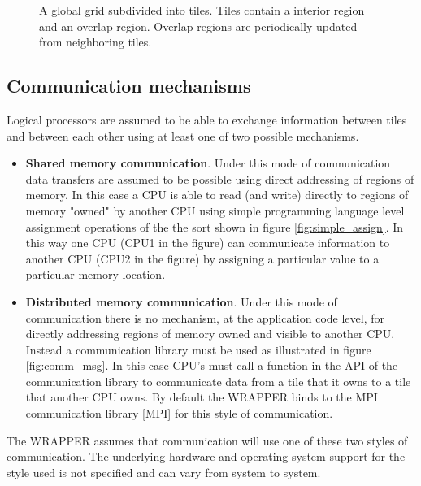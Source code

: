 \begin{figure}
\begin{center}
\end{center}
\caption{ A global grid subdivided into tiles.
Tiles contain a interior region and an overlap region.
Overlap regions are periodically updated from neighboring tiles.
} \label{fig:tiledworld} 
\end{figure}

\subsection{Communication mechanisms}

 Logical processors are assumed to be able to exchange information
between tiles and between each other using at least one of two possible 
mechanisms. 

\begin{itemize}
\item {\bf Shared memory communication}.
Under this mode of communication data transfers are assumed to be possible 
using direct addressing of regions of memory. In this case a CPU is able to read
(and write) directly to regions of memory "owned" by another CPU
using simple programming language level assignment operations of the
the sort shown in figure \ref{fig:simple_assign}. In this way one CPU
(CPU1 in the figure) can communicate information to another CPU (CPU2 in the 
figure) by assigning a particular value to a particular memory location.

\item {\bf Distributed memory communication}. 
Under this mode of communication there is no mechanism, at the application code level,
for directly addressing regions of memory owned and visible to another CPU. Instead 
a communication library must be used as illustrated in figure 
\ref{fig:comm_msg}. In this case CPU's must call a function in the API of the 
communication library to communicate data from a tile that it owns to a tile
that another CPU owns. By default the WRAPPER binds to the MPI communication
library \ref{MPI} for this style of communication.
\end{itemize}

The WRAPPER assumes that communication will use one of these two styles
of communication. The underlying hardware and operating system support
for the style used is not specified and can vary from system to system.

